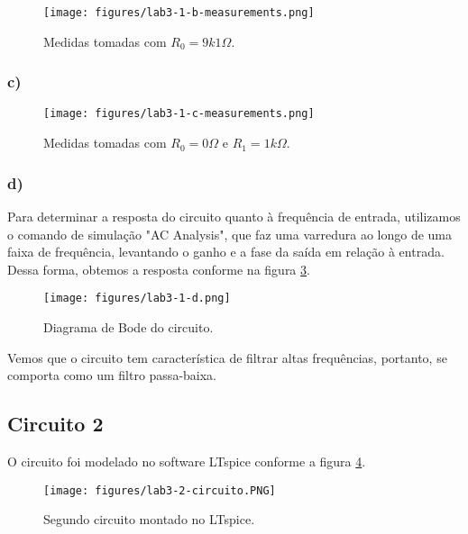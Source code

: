 \documentclass[a4paper]{report}
\begin{document}
\begin{figure}[H]
    \centering
    \texttt{[image: figures/lab3-1-b-measurements.png]}
    \caption{Medidas tomadas com $R_0=9k1 \Omega$.}
    \label{fig:figures-lab3-1-a-measurements-png}
\end{figure}

\subsubsection*{c)}

\begin{figure}[H]
    \centering
    \texttt{[image: figures/lab3-1-c-measurements.png]}
    \caption{Medidas tomadas com $R_0=0 \Omega$ e $R_1 = 1 k\Omega$.}
    \label{fig:figures-lab3-1-a-measurements-png}
\end{figure}

\subsubsection*{d)}

Para determinar a resposta do circuito quanto à frequência de entrada, utilizamos o comando de simulação "AC Analysis", que faz uma varredura ao longo de uma faixa de frequência, levantando o ganho e a fase da saída em relação à entrada. Dessa forma, obtemos a resposta conforme na figura \ref{fig:figures-lab3-1-a-measurements-png}.

\begin{figure}[H]
    \centering
    \texttt{[image: figures/lab3-1-d.png]}
    \caption{Diagrama de Bode do circuito.}
    \label{fig:figures-lab3-1-a-measurements-png}
\end{figure}

Vemos que o circuito tem característica de filtrar altas frequências, portanto, se comporta como um filtro passa-baixa.

\subsection*{Circuito 2}

O circuito foi modelado no software LTspice conforme a figura \ref{fig:figures-lab3-2-circuito-png}.

\begin{figure}[H]
    \centering
    \texttt{[image: figures/lab3-2-circuito.PNG]}
    \caption{Segundo circuito montado no LTspice.}
    \label{fig:figures-lab3-2-circuito-png}
\end{figure}
\end{document}
